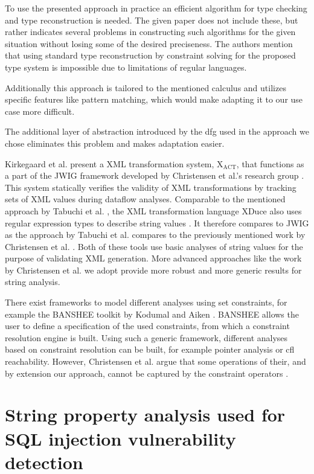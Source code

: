 To use the presented approach in practice an efficient algorithm for type checking and type reconstruction is needed. 
The given paper does not include these, but rather indicates several problems in constructing such algorithms for the given situation without losing some of the desired preciseness.
The authors mention that using standard type reconstruction by constraint solving for the proposed type system is impossible due to limitations of regular languages.

Additionally this approach is tailored to the mentioned calculus and utilizes specific features like pattern matching, which would make adapting it to our use case more difficult.

The additional layer of abstraction introduced by the \ac{dfg} used in the approach we chose eliminates this problem and makes adaptation easier.

Kirkegaard et al. present a XML transformation system, $\text{X}_{\text{ACT}}$, that functions as a part of the JWIG framework developed by Christensen et al.'s research group \cite{xact}. This system statically verifies the validity of XML transformations by tracking sets of XML values during dataflow analyses.
Comparable to the mentioned approach by Tabuchi et al. \cite{regex_types}, the XML transformation language XDuce also uses regular expression types to describe string values \cite{xduce}. It therefore compares to JWIG as the approach by Tabuchi et al. compares to the previously mentioned work by Christensen et al. \cite{brics}. 
Both of these tools use basic analyses of string values for the purpose of validating XML generation. More advanced approaches like the work by Christensen et al. we adopt provide more robust and more generic results for string analysis.

There exist frameworks to model different analyses using set constraints, for example the BANSHEE toolkit by Kodumal and Aiken \cite{banshee}. BANSHEE allows the user to define a specification of the used constraints, from which a constraint resolution engine is built. Using such a generic framework, different analyses based on constraint resolution can be built, for example pointer analysis or \ac{cfl} reachability. However, Christensen et al. argue that some operations of their, and by extension our approach, cannot be captured by the constraint operators \cite{brics}.

\section{String property analysis used for SQL injection vulnerability detection}\label{sec:related:stringPropertySql}

